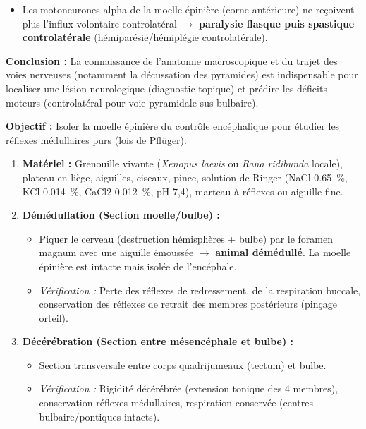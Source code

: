 \documentclass[11pt]{article}
\begin{document}
\begin{exoresolu}
\begin{enumerate}
\begin{itemize}
        \item Les motoneurones alpha de la moelle épinière (corne antérieure) ne reçoivent plus l'influx volontaire controlatéral $\rightarrow$ \textbf{paralysie flasque puis spastique controlatérale} (hémiparésie/hémiplégie controlatérale).
    \end{itemize}
\end{enumerate}
\textbf{Conclusion :} La connaissance de l'anatomie macroscopique et du trajet des voies nerveuses (notamment la décussation des pyramides) est indispensable pour localiser une lésion neurologique (diagnostic topique) et prédire les déficits moteurs (controlatéral pour voie pyramidale sus-bulbaire).
\end{exoresolu}

\begin{methode}
\textbf{Objectif :} Isoler la moelle épinière du contrôle encéphalique pour étudier les réflexes médullaires purs (lois de Pflüger).
\begin{enumerate}
    \item \textbf{Matériel :} Grenouille vivante (\textit{Xenopus laevis} ou \textit{Rana ridibunda} locale), plateau en liège, aiguilles, ciseaux, pince, solution de Ringer (NaCl \SI{0,65}{\%}, KCl \SI{0,014}{\%}, CaCl2 \SI{0,012}{\%}, pH 7,4), marteau à réflexes ou aiguille fine.
    \item \textbf{Démédullation (Section moelle/bulbe) :}
    \begin{itemize}
        \item Piquer le cerveau (destruction hémisphères + bulbe) par le foramen magnum avec une aiguille émoussée $\rightarrow$ \textbf{animal démédullé}. La moelle épinière est intacte mais isolée de l'encéphale.
        \item \textit{Vérification :} Perte des réflexes de redressement, de la respiration buccale, conservation des réflexes de retrait des membres postérieurs (pinçage orteil).
    \end{itemize}
    \item \textbf{Décérébration (Section entre mésencéphale et bulbe) :}
    \begin{itemize}
        \item Section transversale entre corps quadrijumeaux (tectum) et bulbe.
        \item \textit{Vérification :} Rigidité décérébrée (extension tonique des 4 membres), conservation réflexes médullaires, respiration conservée (centres bulbaire/pontiques intacts).

\end{itemize}
\end{enumerate}
\end{methode}
\end{document}
